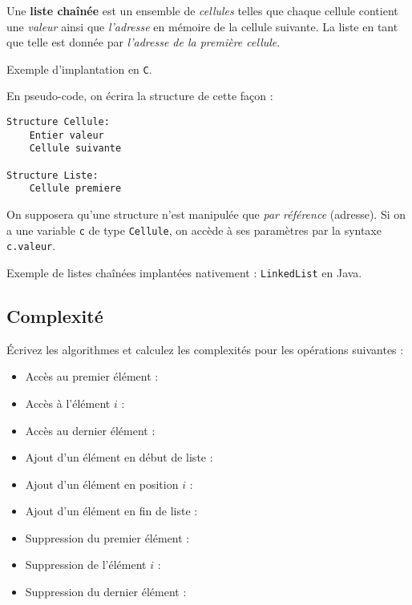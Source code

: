 \documentclass{../cours}
\begin{document}
\begin{Definition}
Une \textbf{liste chaînée} est un ensemble de \emph{cellules} telles que chaque cellule contient une \emph{valeur} ainsi que \emph{l'adresse} en mémoire de la cellule suivante. La liste en tant que telle est donnée par \emph{l'adresse de la première cellule}.
\end{Definition}

\begin{Example}
Exemple d'implantation en {\tt C}.

 


\end{Example}

En pseudo-code, on écrira la structure de cette façon :

\begin{lstlisting}
Structure Cellule:
    Entier valeur
    Cellule suivante
    
Structure Liste:
    Cellule premiere
\end{lstlisting}

On supposera qu'une structure n'est manipulée que \emph{par référence} (adresse). Si on a une variable {\tt c} de type {\tt Cellule}, on accède à ses paramètres par la syntaxe {\tt c.valeur}.

Exemple de listes chaînées implantées nativement : {\tt LinkedList} en Java.

\subsection{Complexité}

\begin{exercice}
\'Ecrivez les algorithmes et calculez les complexités pour les opérations suivantes :

\begin{itemize}
\item Accès au premier élément : 
\item Accès à l'élément $i$ : 
\item Accès au dernier élément : 
\item Ajout d'un élément en début de liste : 
\item Ajout d'un élément en position $i$ : 
\item Ajout d'un élément en fin de liste : 
\item Suppression du premier élément : 
\item Suppression de l'élément $i$ : 
\item Suppression du dernier élément : 
\end{itemize}

\end{exercice}
\end{document}
